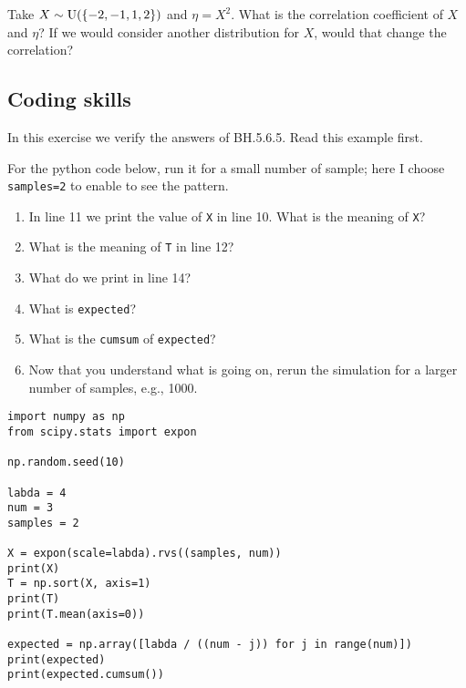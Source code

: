 \documentclass[assignments]{subfiles}
\begin{document}
\begin{exercise}
Take $X\sim\mathrm{U}(\{-2, -1, 1, 2\})$ and $\eta = X^2$. What is the correlation coefficient of $X$ and $\eta$? 
If we would consider another distribution for $X$, would that change the correlation?
\end{exercise}



\subsection{Coding skills}
\label{sec:progr-assignm}



\begin{exercise}
In this exercise we verify the answers of BH.5.6.5. Read this example first.   

For the python  code below, run it for a small number of sample;  here I choose  \texttt{samples=2} to enable to see the pattern. 
\begin{enumerate}
\item In line 11 we print the value of \texttt{X} in line 10. What is the meaning of \texttt{X}?
\item What is the meaning of \texttt{T} in line 12? 
\item What do we print in line 14? 
\item What is \texttt{expected}? 
\item What is the \texttt{cumsum} of \texttt{expected}? 
\item Now that you understand what is going on, rerun the simulation for a larger number of samples, e.g., 1000.
\end{enumerate}


\begin{verbatim}
import numpy as np
from scipy.stats import expon

np.random.seed(10)

labda = 4
num = 3
samples = 2

X = expon(scale=labda).rvs((samples, num))
print(X)
T = np.sort(X, axis=1)
print(T)
print(T.mean(axis=0))

expected = np.array([labda / ((num - j)) for j in range(num)])
print(expected)
print(expected.cumsum())
\end{verbatim}
\end{exercise}
\end{document}
